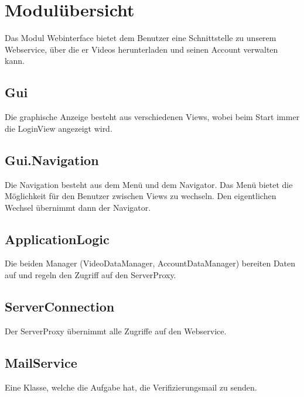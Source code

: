 \section{Modulübersicht} \label{interface:modul}
Das Modul Webinterface bietet dem Benutzer eine Schnittstelle zu unserem Webservice, über die er Videos herunterladen und seinen Account verwalten kann. 

\subsection{Gui}
Die graphische Anzeige besteht aus verschiedenen Views, wobei beim Start immer die LoginView angezeigt wird.

\subsection{Gui.Navigation}
Die Navigation besteht aus dem Menü und dem Navigator. Das Menü bietet die Möglichkeit für den Benutzer zwischen Views zu wechseln. Den eigentlichen Wechsel übernimmt dann der Navigator.

\subsection{ApplicationLogic}
Die beiden Manager (VideoDataManager, AccountDataManager) bereiten Daten auf und regeln den Zugriff auf den ServerProxy.

\subsection{ServerConnection}
Der ServerProxy übernimmt alle Zugriffe auf den Webservice.

\subsection{MailService}
Eine Klasse, welche die Aufgabe hat, die Verifizierungsmail zu senden.
\newpage
